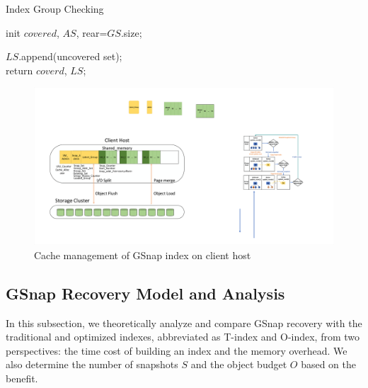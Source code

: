 \documentclass[sigconf, nonacm]{acmart}
\begin{document}
\begin{algorithm}[htbp]
	\caption{Index Group Checking}
	\label{algorithm:locate}
	
	init $covered$, $AS$, rear=$GS$.size;\\
	{
	
	}
	{
		$LS$.append(uncovered set);\\
		}
	return $coverd$, $LS$;
\end{algorithm}

\begin{figure}[htbp]
	\centering
	\includegraphics[width=\columnwidth]{figures/ceph_pic/cache_managment.pdf}
	\caption{Cache management of GSnap index on client host}
	\label{fig:cache_managment}
\end{figure}

\subsection{GSnap Recovery Model and Analysis}
\label{section:Recovery model}
In this subsection, we theoretically analyze and compare GSnap recovery with the traditional and optimized indexes, abbreviated as T-index and O-index, from two perspectives: the time cost of building an index and the memory overhead. We also determine the number of snapshots $S$ and the object budget $O$ based on the benefit.
\end{document}
